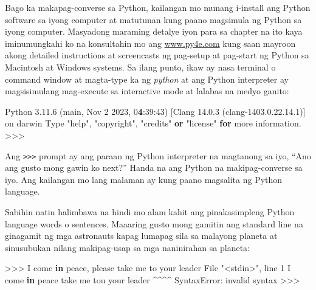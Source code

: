 \documentclass[10pt,]{book}
\newenvironment{Shaded}{}{}
\newcommand{\ControlFlowTok}[1]{\textcolor[rgb]{0.00,0.44,0.13}{\textbf{#1}}}
\newcommand{\DecValTok}[1]{\textcolor[rgb]{0.25,0.63,0.44}{#1}}
\newcommand{\ErrorTok}[1]{\textcolor[rgb]{1.00,0.00,0.00}{\textbf{#1}}}
\newcommand{\FloatTok}[1]{\textcolor[rgb]{0.25,0.63,0.44}{#1}}
\newcommand{\KeywordTok}[1]{\textcolor[rgb]{0.00,0.44,0.13}{\textbf{#1}}}
\newcommand{\NormalTok}[1]{#1}
\newcommand{\OperatorTok}[1]{\textcolor[rgb]{0.40,0.40,0.40}{#1}}
\newcommand{\PreprocessorTok}[1]{\textcolor[rgb]{0.74,0.48,0.00}{#1}}
\newcommand{\StringTok}[1]{\textcolor[rgb]{0.25,0.44,0.63}{#1}}
\begin{document}
Bago ka makapag-converse sa Python, kailangan mo munang i-install ang
Python software sa iyong computer at matutunan kung paano magsimula ng
Python sa iyong computer. Masyadong maraming detalye iyon para sa
chapter na ito kaya iminumungkahi ko na konsultahin mo ang
\href{http://www.py4e.com}{www.py4e.com} kung saan mayroon akong
detailed instructions at screencasts ng pag-setup at pag-start ng Python
sa Macintosh at Windows systems. Sa ilang punto, ikaw ay nasa terminal o
command window at magta-type ka ng \emph{python} at ang Python
interpreter ay magsisimulang mag-execute sa interactive mode at lalabas
na medyo ganito:


\begin{Shaded}
\begin{Highlighting}[]
\NormalTok{Python }\FloatTok{3.11.6}\NormalTok{ (main, Nov  }\DecValTok{2} \DecValTok{2023}\NormalTok{, }\DecValTok{0}\ErrorTok{4}\NormalTok{:}\DecValTok{39}\NormalTok{:}\DecValTok{43}\NormalTok{) }
\NormalTok{   [Clang }\FloatTok{14.0.3}\NormalTok{ (clang}\OperatorTok{{-}}\FloatTok{1403.0.22.14.1}\NormalTok{)] on darwin}
\NormalTok{Type }\StringTok{"help"}\NormalTok{, }\StringTok{"copyright"}\NormalTok{, }\StringTok{"credits"} \KeywordTok{or} \StringTok{"license"} \ControlFlowTok{for}\NormalTok{ more}
\NormalTok{information.}
\OperatorTok{\textgreater{}\textgreater{}\textgreater{}}
\end{Highlighting}
\end{Shaded}

Ang \texttt{\textgreater{}\textgreater{}\textgreater{}} prompt ay ang
paraan ng Python interpreter na magtanong sa iyo, ``Ano ang gusto mong
gawin ko next?'' Handa na ang Python na makipag-converse sa iyo. Ang
kailangan mo lang malaman ay kung paano magsalita ng Python language.

Sabihin natin halimbawa na hindi mo alam kahit ang pinakasimpleng Python
language words o sentences. Maaaring gusto mong gamitin ang standard
line na ginagamit ng mga astronauts kapag lumapag sila sa malayong
planeta at sinusubukan nilang makipag-usap sa mga naninirahan sa
planeta:

\begin{Shaded}
\begin{Highlighting}[]
\OperatorTok{\textgreater{}\textgreater{}\textgreater{}}\NormalTok{ I come }\KeywordTok{in}\NormalTok{ peace, please take me to your leader}
\NormalTok{File }\StringTok{"\textless{}stdin\textgreater{}"}\NormalTok{, line }\DecValTok{1}
\NormalTok{    I come }\KeywordTok{in}\NormalTok{ peace take me tou your leader}
      \OperatorTok{\^{}\^{}\^{}\^{}}
\PreprocessorTok{SyntaxError}\NormalTok{: invalid syntax}
\OperatorTok{\textgreater{}\textgreater{}\textgreater{}}
\end{Highlighting}
\end{Shaded}
\end{document}

